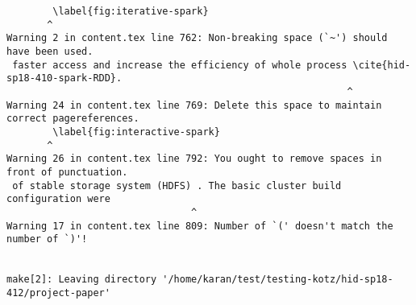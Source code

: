 \begin{tiny}
\begin{verbatim}
        \label{fig:iterative-spark}  
       ^
Warning 2 in content.tex line 762: Non-breaking space (`~') should have been used.
 faster access and increase the efficiency of whole process \cite{hid-sp18-410-spark-RDD}.  
                                                           ^
Warning 24 in content.tex line 769: Delete this space to maintain correct pagereferences.
        \label{fig:interactive-spark}  
       ^
Warning 26 in content.tex line 792: You ought to remove spaces in front of punctuation.
 of stable storage system (HDFS) . The basic cluster build configuration were   
                                ^
Warning 17 in content.tex line 809: Number of `(' doesn't match the number of `)'!


make[2]: Leaving directory '/home/karan/test/testing-kotz/hid-sp18-412/project-paper'
\end{verbatim}
\end{tiny}
